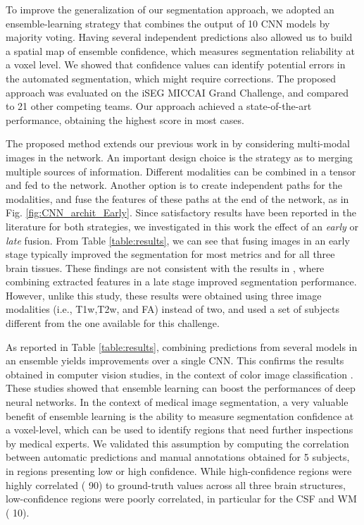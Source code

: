 \documentclass[twoside,espcrc2]{elsarticle}
\begin{document}
To improve the generalization of our segmentation approach, we adopted an ensemble-learning strategy that combines the output of 10 CNN models by majority voting. Having several independent predictions also allowed us to build a spatial map of ensemble confidence, which measures segmentation reliability at a voxel level. We showed that confidence values can identify potential errors in the automated segmentation, which might require corrections. The proposed approach was evaluated on the iSEG MICCAI Grand Challenge, and compared to 21 other competing teams. Our approach achieved a state-of-the-art performance, obtaining the highest score in most cases.

The proposed method extends our previous work in \cite{DolzNeuro2017} by considering multi-modal images in the network. An important design choice is the strategy as to merging multiple sources of information. Different modalities can be combined in a tensor and fed to the network. Another option is to create independent paths for the modalities, and fuse the features of these paths at the end of the network, as in Fig. \ref{fig:CNN_archit_Early}. Since satisfactory results have been reported in the literature for both strategies, we investigated in this work the effect of an \textit{early} or \textit{late} fusion. From Table \ref{table:results}, we can see that fusing images in an early stage typically improved the segmentation for most metrics and for all three brain tissues. These findings are not consistent with the results in \cite{nie2016fully}, where combining extracted features in a late stage improved segmentation performance. However, unlike this study, these results were obtained using three image modalities (i.e., T1w,T2w, and FA) instead of two, and used a set of subjects different from the one available for this challenge.

As reported in Table \ref{table:results}, combining predictions from several models in an ensemble yields improvements over a single CNN. This confirms the results obtained in computer vision studies, in the context of color image classification \cite{krizhevsky2012imagenet,zeiler2014visualizing}. These studies showed that ensemble learning can boost the performances of deep neural networks. 
In the context of medical image segmentation, a very valuable benefit of ensemble learning is the ability to measure segmentation confidence at a voxel-level, which can be used to identify regions that need further inspections by medical experts. We validated this assumption by computing the correlation between automatic predictions and manual annotations obtained for 5 subjects, in regions presenting low or high confidence. While high-confidence regions were highly correlated ( 90) to ground-truth values across all three brain structures, low-confidence regions were poorly correlated, in particular for the CSF and WM ( 10). 
\end{document}
